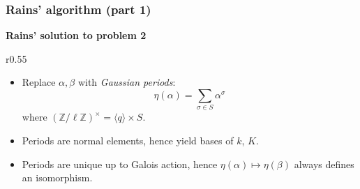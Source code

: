 \documentclass[francais]{beamer}
\def\Q {\ensuremath{\mathbb{Q}}}
\def\Z {\ensuremath{\mathbb{Z}}}
\def\F {\ensuremath{\mathbb{F}}}
\newcommand{\paragraph}[1]{\smallskip\textbf{#1}}
\begin{document}
\begin{frame}\frametitle{Rains' algorithm (part 1)}
  \paragraph{Rains' solution to problem 2}
  \vspace{-1em}
  \begin{wrapfigure}[6]{r}{0.55\textwidth}
    \vspace{-1em}
    \end{wrapfigure}

    \begin{itemize}
    \item Replace $\alpha,\beta$ with \emph{Gaussian periods}:
      \[\eta(\alpha) = \sum_{\sigma\in S}\alpha^\sigma\]
      where $(\Z/\ell\Z)^\times = \langle q\rangle \times S$.
    \end{itemize}

    \begin{itemize}
    \item Periods are normal elements, hence yield bases of $k$, $K$.
    \item Periods are unique up to Galois action, hence $\eta(\alpha)\mapsto\eta(\beta)$ always defines an isomorphism.
    \end{itemize}
\end{frame}
\end{document}
